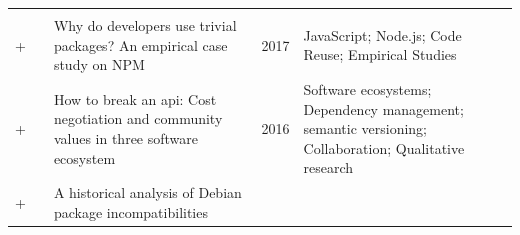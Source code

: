\documentclass[]{book}
\begin{document}
\begin{longtable}[]{@{}lllll@{}}
\begin{minipage}[t]{0.39\columnwidth}
\strut
\end{minipage}\tabularnewline
\begin{minipage}[t]{0.01\columnwidth}\raggedright\strut
+\strut
\end{minipage} & \begin{minipage}[t]{0.09\columnwidth}\raggedright\strut
\citet{Abdalkareem2017}\strut
\end{minipage} & \begin{minipage}[t]{0.34\columnwidth}\raggedright\strut
Why do developers use trivial packages? An empirical case study on
NPM\strut
\end{minipage} & \begin{minipage}[t]{0.02\columnwidth}\raggedright\strut
2017\strut
\end{minipage} & \begin{minipage}[t]{0.39\columnwidth}\raggedright\strut
JavaScript; Node.js; Code Reuse; Empirical Studies\strut
\end{minipage}\tabularnewline
\begin{minipage}[t]{0.01\columnwidth}\raggedright\strut
+\strut
\end{minipage} & \begin{minipage}[t]{0.09\columnwidth}\raggedright\strut
\citet{Bogart2016}\strut
\end{minipage} & \begin{minipage}[t]{0.34\columnwidth}\raggedright\strut
How to break an api: Cost negotiation and community values in three
software ecosystem\strut
\end{minipage} & \begin{minipage}[t]{0.02\columnwidth}\raggedright\strut
2016\strut
\end{minipage} & \begin{minipage}[t]{0.39\columnwidth}\raggedright\strut
Software ecosystems; Dependency management; semantic versioning;
Collaboration; Qualitative research\strut
\end{minipage}\tabularnewline
\begin{minipage}[t]{0.01\columnwidth}\raggedright\strut
+\strut
\end{minipage} & \begin{minipage}[t]{0.09\columnwidth}\raggedright\strut
\citet{Claes2015}\strut
\end{minipage} & \begin{minipage}[t]{0.34\columnwidth}\raggedright\strut
A historical analysis of Debian package incompatibilities\strut
\end{minipage} & \begin{minipage}[t]{0.02\columnwidth}\raggedright\strut

\end{minipage}
\end{longtable}
\end{document}
